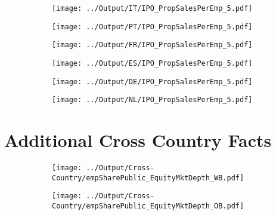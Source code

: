 \documentclass[12pt,notitlepage]{article}
\begin{document}
\FloatBarrier
\begin{figure}[!htpb]
\centering
\caption{Sales Per Employee Growth Over IPOs}
\begin{subfigure}{.49\textwidth}
    \centering
 \texttt{[image: ../Output/IT/IPO\_PropSalesPerEmp\_5.pdf]}
\end{subfigure}%
\begin{subfigure}{.49\textwidth}
    \centering
 \texttt{[image: ../Output/PT/IPO\_PropSalesPerEmp\_5.pdf]}
\end{subfigure}
\begin{subfigure}{.49\textwidth}
    \centering
 \texttt{[image: ../Output/FR/IPO\_PropSalesPerEmp\_5.pdf]}
\end{subfigure}%
\begin{subfigure}{.49\textwidth}
    \centering
 \texttt{[image: ../Output/ES/IPO\_PropSalesPerEmp\_5.pdf]}
\end{subfigure}
\begin{subfigure}{.49\textwidth}
    \centering
 \texttt{[image: ../Output/DE/IPO\_PropSalesPerEmp\_5.pdf]}
\end{subfigure}
\begin{subfigure}{.49\textwidth}
    \centering
 \texttt{[image: ../Output/NL/IPO\_PropSalesPerEmp\_5.pdf]}
\end{subfigure}
\end{figure}






\appendix

\section{Additional Cross Country Facts} %
\label{sec:additional_cross_country_facts}

\begin{figure}[!htpb]
\centering
\caption{Share of Employment in Public Firms}
\begin{subfigure}{.49\textwidth}
    \centering
 \texttt{[image: ../Output/Cross-Country/empSharePublic\_EquityMktDepth\_WB.pdf]}
\end{subfigure}
\begin{subfigure}{.49\textwidth}
    \centering
  \texttt{[image: ../Output/Cross-Country/empSharePublic\_EquityMktDepth\_OB.pdf]}
\end{subfigure}
\end{figure}
\FloatBarrier
\end{document}
